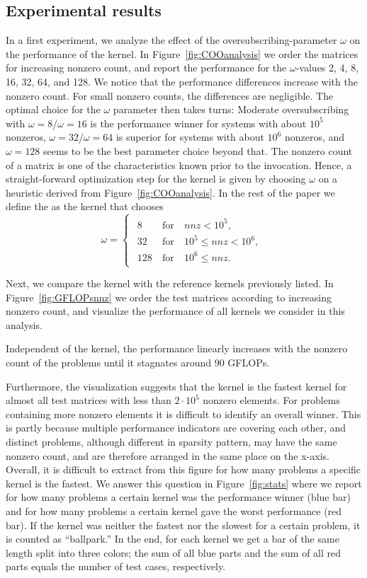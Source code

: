 \subsection{Experimental results}
In a first experiment, we analyze the effect of the oversubscribing-parameter $\omega$ 
on the performance of the \coo kernel.
In Figure~\ref{fig:COOanalysis} we order the matrices for increasing nonzero count, 
and report the performance for the $\omega$-values 2, 4, 8, 16, 32, 64, and 128.
We notice that the performance differences increase with the
nonzero count. For small nonzero counts, the differences are negligible. 
The optimal choice for the $\omega$ parameter then takes turns: 
Moderate oversubscribing with $\omega=8$/$\omega=16$ 
is the performance winner for systems with about $10^5$ nonzeros,
$\omega=32$/$\omega=64$ is superior for systems with about $10^6$ nonzeros,
and $\omega=128$ seems to be the best parameter choice beyond that.
The nonzero count of a matrix is one of the characteristics known prior
to the \spmv invocation. 
Hence, a straight-forward optimization step for the \coo kernel is given 
by choosing $\omega$ on a heuristic derived from Figure~\ref{fig:COOanalysis}.
In the rest of the paper we define the \coo as the kernel that chooses 
\[
\omega =
\begin{cases}
\begin{array}{lll}
8 & \mathrm{\ for\ } & nnz<10^5,\\
32 & \mathrm{\ for\ } & 10^5 \leq nnz<10^6,\\
128 & \mathrm{\ for\ }&10^6 \leq nnz.
\end{array}
\end{cases}
\]

Next, we compare the \coo kernel with the reference kernels previously listed. 
In Figure~\ref{fig:GFLOPsnnz} we order the test matrices according to increasing nonzero count,
and visualize the performance of all \spmv kernels we consider in this analysis. 

Independent of the \spmv kernel, the performance linearly increases with the nonzero count of the problems until it stagnates around 90 GFLOPs. 

Furthermore, the visualization suggests that the \coo kernel is the fastest kernel for almost 
all test matrices
with less than $2 \cdot 10^5$ nonzero elements. For problems containing more nonzero elements it
is difficult to identify an overall winner. This is partly because multiple
performance indicators are covering each other, and distinct problems, although different in
sparsity pattern, may have the same nonzero count, and are therefore arranged in the same place on the x-axis. 
Overall, it is difficult to extract from this figure for how many problems a specific kernel is the fastest. 
We answer this question in Figure~\ref{fig:stats} where we report for how many problems a certain kernel was the performance winner (blue bar) and for how many problems a certain kernel gave the worst performance (red bar). If the kernel was neither the fastest nor the slowest for a certain problem, it is counted as ``ballpark.'' In the end, for each kernel we get a bar of the same length split into three colors; the sum of all blue parts and the sum of all red parts equals the number of test cases, respectively.

